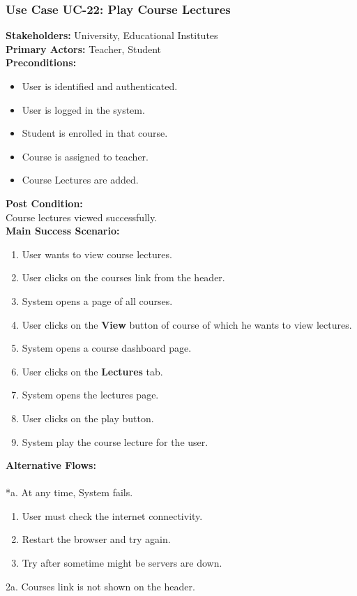 \documentclass[12pt]{article}
\begin{document}
\subsubsection{Use Case UC-22: Play Course Lectures}
\textbf{Stakeholders: } University, Educational Institutes \\
\textbf{Primary Actors: }Teacher, Student \\
\newpage
\textbf{Preconditions:}
\begin{itemize}
\item User is identified and authenticated.
\item User is logged in the system.
\item Student is enrolled in that course.
\item Course is assigned to teacher.
\item Course Lectures are added.
\end{itemize}
\textbf{Post Condition: }\\
Course lectures viewed successfully.\\
\textbf{Main Success Scenario:}
\begin{enumerate}
\item User wants to view course lectures.
\item User clicks on the courses link from the header.
\item System opens a page of all courses.
\item User clicks on the \textbf{View} button of course of which he wants to view lectures.
\item System opens a course dashboard page.
\item User clicks on the \textbf{Lectures} tab.
\item System opens the lectures page.
\item User clicks on the play button.
\item System play the course lecture for the user.
\end{enumerate}
\textbf{Alternative Flows:}\\
\\
*a. At any time, System fails.
\begin{enumerate}
\item User must check the internet connectivity.
\item Restart the browser and try again.
\item Try after sometime might be servers are down.
\end{enumerate}
2a. Courses link is not shown on the header.
\end{document}
